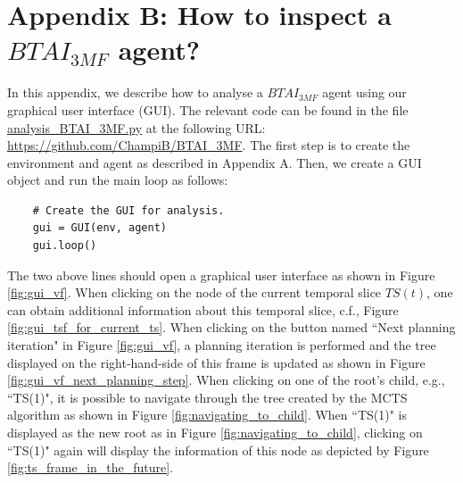 \documentclass[twoside,11pt]{article}
\begin{document}
\section*{Appendix B: How to inspect a $BTAI_{3MF}$ agent?}

In this appendix, we describe how to analyse a $BTAI_{3MF}$ agent using our graphical user interface (GUI). The relevant code can be found in the file \url{analysis_BTAI_3MF.py} at the following URL: \url{https://github.com/ChampiB/BTAI_3MF}. The first step is to create the environment and agent as described in Appendix A. Then, we create a GUI object and run the main loop as follows:
\begin{verbatim}
    # Create the GUI for analysis.
    gui = GUI(env, agent)
    gui.loop()
\end{verbatim}
The two above lines should open a graphical user interface as shown in Figure \ref{fig:gui_vf}. When clicking on the node of the current temporal slice $TS(t)$, one can obtain additional information about this temporal slice, c.f., Figure \ref{fig:gui_tsf_for_current_ts}. When clicking on the button named ``Next planning iteration" in Figure \ref{fig:gui_vf}, a planning iteration is performed and the tree displayed on the right-hand-side of this frame is updated as shown in Figure \ref{fig:gui_vf_next_planning_step}. When clicking on one of the root's child, e.g., ``TS(1)", it is possible to navigate through the tree created by the MCTS algorithm as shown in Figure \ref{fig:navigating_to_child}. When ``TS(1)" is displayed as the new root as in Figure \ref{fig:navigating_to_child}, clicking on ``TS(1)" again will display the information of this node as depicted by Figure \ref{fig:ts_frame_in_the_future}. 
\end{document}
